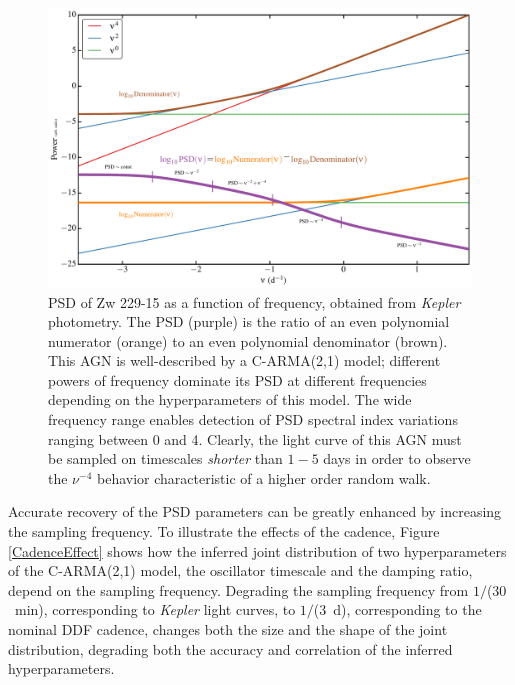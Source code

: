 \begin{figure}
\includegraphics[width=5.0in]{figs/agn/AGN_Variability_01.pdf}
\caption{PSD of Zw 229-15 as a function of frequency, obtained from {\em Kepler}
photometry. The PSD (purple) is the ratio of an even polynomial numerator (orange)
to an even polynomial denominator (brown). This AGN is well-described by a
C-ARMA(2,1) model; different powers of frequency dominate its PSD at different
frequencies depending on the hyperparameters of this model. The wide
frequency range enables detection of PSD spectral index variations ranging
between 0 and 4. Clearly, the light curve of this AGN must be sampled on
timescales {\em shorter} than $1-5$ days in order to observe the $\nu^{-4}$
behavior characteristic of a higher order random walk.
}
\label{PSDvsFreq}
\end{figure}

Accurate recovery of the PSD parameters can be greatly enhanced by increasing the
sampling frequency. To illustrate the effects of the cadence, Figure \ref{CadenceEffect}
shows how the inferred joint distribution of two hyperparameters of the C-ARMA(2,1)
model, the oscillator timescale and the damping ratio, depend on the sampling frequency.
Degrading the sampling frequency from $1/$($30$~min), corresponding to {\em Kepler}
light curves, to $1/$($3$~d), corresponding to the nominal DDF cadence, changes both
the size and the shape of the joint distribution, degrading both the accuracy and
correlation of the inferred hyperparameters. 

